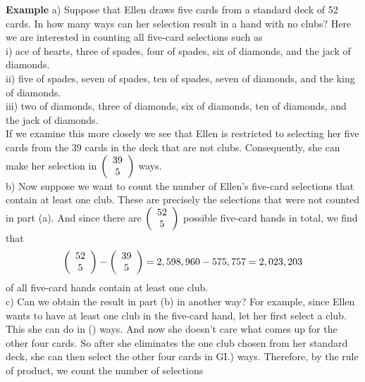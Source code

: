 \documentclass[11pt]{article}
\begin{document}
\textbf{Example} a) Suppose that Ellen draws five cards from a standard deck of 52 cards. 
In how many ways can her selection result in a hand with no clubs? Here we are 
interested in counting all five-card selections such as\\
i) ace of hearts, three of spades, four of spades, six of diamonds, and the jack of 
diamonds.\\
ii) five of spades, seven of spades, ten of spades, seven of diamonds, and the king of 
diamonds.\\
iii) two of diamonds, three of diamonds, six of diamonds, ten of diamonds, and the jack of 
diamonds.\\
If we examine this more closely we see that Ellen is restricted to selecting her five cards 
from the 39 cards in the deck that are not clubs. Consequently, she can make her 
selection in 
$\left( {\begin{array}{*{20}c}  39  \\  5  \\ \end{array}} \right)$ 
ways.\\
b) Now suppose we want to count the number of Ellen's five-card selections that contain 
at least one club. These are precisely the selections that were not counted in part (a). And 
since there are
$\left( {\begin{array}{*{20}c} 52  \\ 5  \\ \end{array}} \right)$ 
possible five-card hands in total, we find that 
$$ \left( {\begin{array}{*{20}c} 52  \\ 5  \\ \end{array}} \right) - \left( {\begin{array}{*{20}c} 39  \\ 5  \\ \end{array}} \right) = 2,598,960 - 575,757 = 2,023,203  $$
of all five-card hands contain at least one club.\\
c) Can we obtain the result in part (b) in another way? For example, since Ellen wants to 
have at least one club in the five-card hand, let her first select a club. This she can do in () 
ways. And now she doesn't care what comes up for the other four cards. So after she 
eliminates the one club chosen from her standard deck, she can then select the other four 
cards in GI.) ways. Therefore, by the rule of product, we count the number of selections 
\end{document}
